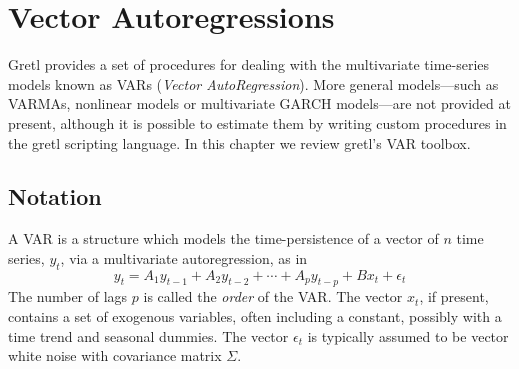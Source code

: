 \chapter{Vector Autoregressions}
\label{chap:var}

Gretl provides a set of procedures for dealing with the multivariate
time-series models known as VARs (\emph{Vector AutoRegression}). More
general models---such as VARMAs, nonlinear models or multivariate GARCH
models---are not provided at present, although it is possible to
estimate them by writing custom procedures in the gretl scripting
language. In this chapter we review gretl's VAR toolbox.

\section{Notation}
\label{sec:var-def}

A VAR is a structure which models the time-persistence of a vector of
$n$ time series, $y_t$, via a multivariate autoregression, as in
\begin{equation}
  \label{eq:VAR}
  y_t = A_1 y_{t-1} + A_2 y_{t-2} + \cdots + A_p y_{t-p} +
  B x_t + \epsilon_t 
\end{equation}
The number of lags $p$ is called the \emph{order} of the VAR. The
vector $x_t$, if present, contains a set of exogenous variables, often
including a constant, possibly with a time trend and seasonal
dummies. The vector $\epsilon_t$ is typically assumed to be vector
white noise with covariance matrix $\Sigma$.

